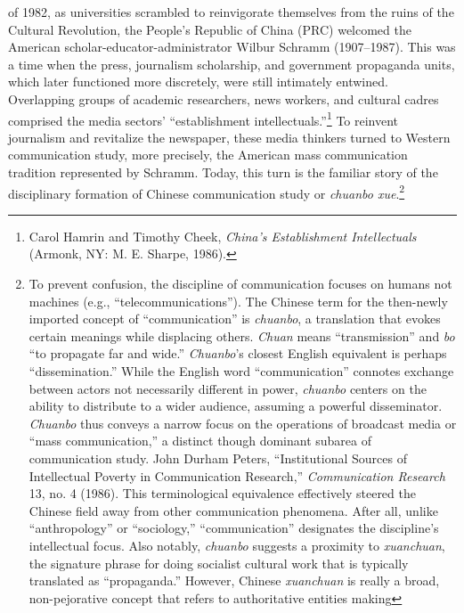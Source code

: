 \documentclass{tufte-handout}
\begin{document}
\begin{CJK*}{UTF8}{gbsn} 

 of 1982, as universities scrambled to reinvigorate
themselves from the ruins of the Cultural Revolution, the
People's
Republic of China (PRC) welcomed the American
scholar-educator-administrator Wilbur Schramm (1907--1987). This was a
time when the press, journalism scholarship, and government propaganda
units, which later functioned more discretely, were still intimately
entwined. Overlapping groups of academic researchers, news workers, and
cultural cadres comprised the media sectors' ``establishment
intellectuals.''\footnote{Carol Hamrin and Timothy Cheek, \emph{China's
  Establishment Intellectuals} (Armonk, NY: M. E. Sharpe, 1986).} To
reinvent journalism and revitalize the newspaper, these media thinkers
turned to Western communication study, more precisely, the American mass
communication tradition represented by Schramm. Today, this turn is the
familiar story of the disciplinary formation of Chinese communication
study or \emph{chuanbo xue}.\footnote{To prevent confusion, the
  discipline of communication focuses on humans not machines (e.g.,
  ``telecommunications''). The Chinese term for the then-newly imported
  concept of ``communication'' is \emph{chuanbo}, a translation that
  evokes certain meanings while displacing others. \emph{Chuan} means
  ``transmission'' and \emph{bo} ``to propagate far and wide.''
  \emph{Chuanbo}'s closest English equivalent is perhaps
  ``dissemination.'' While the English word ``communication'' connotes
  exchange between actors not necessarily different in power,
  \emph{chuanbo} centers on the ability to distribute to a wider
  audience, assuming a powerful disseminator. \emph{Chuanbo} thus
  conveys a narrow focus on the operations of broadcast media or ``mass
  communication,'' a distinct though dominant subarea of communication
  study. John Durham Peters, ``Institutional Sources of Intellectual
  Poverty in Communication Research,'' \emph{Communication Research} 13,
  no. 4 (1986). This terminological equivalence effectively steered the
  Chinese field away from other communication phenomena. After all,
  unlike ``anthropology'' or ``sociology,'' ``communication'' designates
  the discipline's intellectual focus. Also notably, \emph{chuanbo}
  suggests a proximity to \emph{xuanchuan}, the signature phrase for
  doing socialist cultural work that is typically translated as
  ``propaganda.'' However, Chinese \emph{xuanchuan} is really a broad,
  non-pejorative concept that refers to authoritative entities making
}
\end{CJK*}
\end{document}
